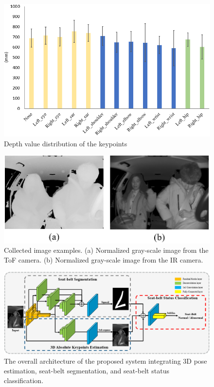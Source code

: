 \documentclass[letterpaper]{article} %
\begin{document}
\begin{figure}[t]
    \centering
    \includegraphics[width=\linewidth]{LaTeX/images/depth_distribution.png}
    \caption{Depth value distribution of the keypoints}
    \label{fig:depth_distrib}
\end{figure}

\begin{figure}[t]
    \centering
    \includegraphics[width=\linewidth]{LaTeX/images/input_images.png}
    \caption{Collected image examples. (a) Normalized gray-scale image from the ToF camera. (b) Normalized gray-scale image from the IR camera.}
    \label{fig:normaliz}
\end{figure}

\begin{figure}[t]
    \centering
    \includegraphics[width=\textwidth]{LaTeX/images/architecture.png}
    \caption{The overall architecture of the proposed system integrating 3D pose estimation, seat-belt segmentation, and seat-belt status classification.}
    \label{fig:architecture}
\end{figure}
\end{document}
